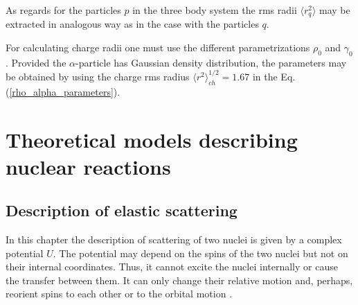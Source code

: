 \documentclass[
12pt, %
oneside, %
english, %
doublespacing, %
doublespacing, %
toctotoc, %
parskip, %
headsepline, %
]{MastersDoctoralThesis} %
\begin{document}
As regards for the particles $p$ in the three body system the rms radii $\langle r_q^2 \rangle$ may be extracted in analogous way as in the case with the particles $q$. 

For calculating charge radii one must use the different parametrizations $\rho_0$ and $\gamma_0$. Provided the $\alpha$-particle has Gaussian density distribution, the parameters may be obtained by using the charge rms radius $\langle r^2 \rangle^{1/2}_{ch}=1.67$ \cite{satchler1979folding} in the Eq. (\ref{rho_alpha_parameters}).

\chapter{Theoretical models describing nuclear reactions} %

\label{Chapter2} %


\section{Description of elastic scattering}
In this chapter the description of scattering of two nuclei is given by a complex potential $U$. The potential may depend on the spins of the two nuclei but not on their internal coordinates. Thus, it cannot excite the nuclei internally or cause the transfer between them. It can only change their relative motion and, perhaps, reorient spins to each other or to the orbital motion \cite{satchler1983}. 
\end{document}
